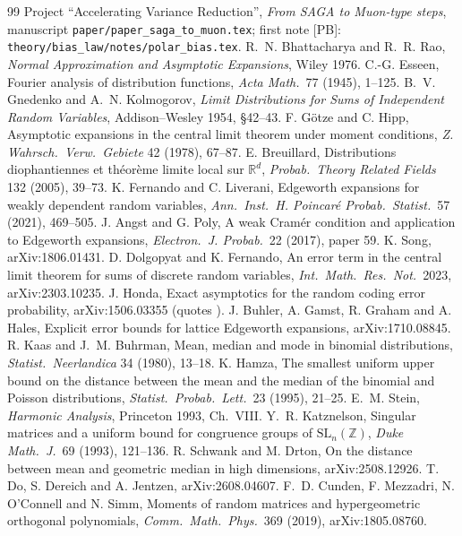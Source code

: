 \documentclass[10pt]{article}
\theoremstyle{definition}
\theoremstyle{remark}
\newcommand{\R}{\mathbb{R}}
\newcommand{\Z}{\mathbb{Z}}
\newcommand{\PB}{\textup{[PB]}}
\begin{document}
\begin{thebibliography}{99}\small
{} Project ``Accelerating Variance Reduction'', \emph{From SAGA to Muon-type steps}, manuscript
\texttt{paper/paper\_saga\_to\_muon.tex}; first note \PB: \texttt{theory/bias\_law/notes/polar\_bias.tex}.
 R.~N. Bhattacharya and R.~R. Rao, \emph{Normal Approximation and Asymptotic Expansions}, Wiley 1976.
 C.-G. Esseen, Fourier analysis of distribution functions, \emph{Acta Math.}\ 77 (1945), 1--125.
 B.~V. Gnedenko and A.~N. Kolmogorov, \emph{Limit Distributions for Sums of Independent Random Variables},
Addison--Wesley 1954, \S42--43.
 F. G\"otze and C. Hipp, Asymptotic expansions in the central limit theorem under moment conditions,
\emph{Z. Wahrsch.\ Verw.\ Gebiete} 42 (1978), 67--87.
 E. Breuillard, Distributions diophantiennes et th\'eor\`eme limite local sur $\R^d$,
\emph{Probab.\ Theory Related Fields} 132 (2005), 39--73.
 K. Fernando and C. Liverani, Edgeworth expansions for weakly dependent random variables,
\emph{Ann.\ Inst.\ H. Poincar\'e Probab.\ Statist.}\ 57 (2021), 469--505.
 J. Angst and G. Poly, A weak Cram\'er condition and application to Edgeworth expansions,
\emph{Electron.\ J. Probab.}\ 22 (2017), paper 59.
 K. Song, arXiv:1806.01431.
 D. Dolgopyat and K. Fernando, An error term in the central limit theorem for sums of discrete random
variables, \emph{Int.\ Math.\ Res.\ Not.}\ 2023, arXiv:2303.10235.
 J. Honda, Exact asymptotics for the random coding error probability, arXiv:1506.03355 (quotes
\cite[Theorem~20.8]{br}).
 J. Buhler, A. Gamst, R. Graham and A. Hales, Explicit error bounds for lattice Edgeworth expansions,
arXiv:1710.08845.
 R. Kaas and J.~M. Buhrman, Mean, median and mode in binomial distributions, \emph{Statist.\ Neerlandica}
34 (1980), 13--18.
 K. Hamza, The smallest uniform upper bound on the distance between the mean and the median of the
binomial and Poisson distributions, \emph{Statist.\ Probab.\ Lett.}\ 23 (1995), 21--25.
 E.~M. Stein, \emph{Harmonic Analysis}, Princeton 1993, Ch.~VIII.
 Y.~R. Katznelson, Singular matrices and a uniform bound for congruence groups of
$\mathrm{SL}_n(\Z)$, \emph{Duke Math.\ J.}\ 69 (1993), 121--136.
 R. Schwank and M. Drton, On the distance between mean and geometric median in high dimensions,
arXiv:2508.12926.
 T. Do, S. Dereich and A. Jentzen, arXiv:2608.04607.
 F.~D. Cunden, F. Mezzadri, N. O'Connell and N. Simm, Moments of random matrices and hypergeometric
orthogonal polynomials, \emph{Comm.\ Math.\ Phys.}\ 369 (2019), arXiv:1805.08760.
\end{thebibliography}
\end{document}
